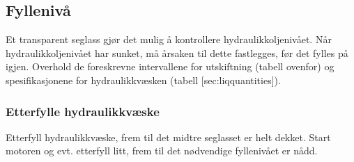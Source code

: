 
\subsection[niveau_hydrau]{Fyllenivå}

Et transparent seglass gjør det mulig å kontrollere hydraulikkoljenivået.
Når hydraulikkoljenivået har sunket, må årsaken til dette fastlegges, før det fylles på igjen. Overhold de foreskrevne intervallene for utskiftning (tabell ovenfor) og spesifikasjonene for hydraulikkvæsken (tabell [sec:liqquantities]).


\subsubsection{Etterfylle hydraulikkvæske}

Etterfyll hydraulikkvæske, frem til det midtre seglasset er helt dekket.
Start motoren og evt. etterfyll litt, frem til det nødvendige fyllenivået er nådd.
